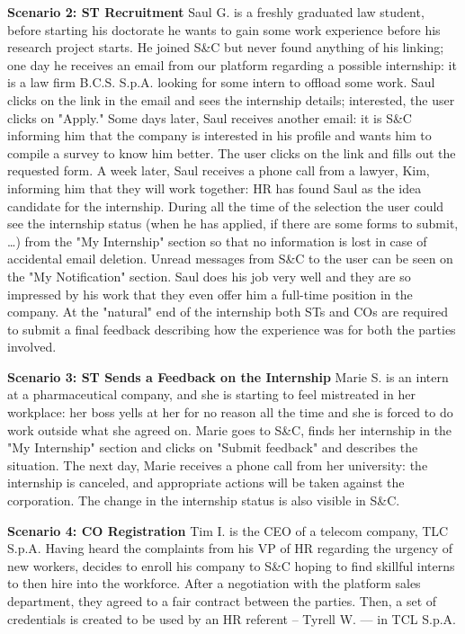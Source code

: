 \par{\textbf{Scenario 2: ST Recruitment}} Saul G. is a freshly graduated law student, before starting his doctorate
he wants to gain some work experience before his research project starts. He joined S\&C but never found anything of his
linking; one day he receives an email from our platform regarding a possible internship: it is a law firm B.C.S. S.p.A.
looking for some intern to offload some work. Saul clicks on the link in the email and sees the internship details;
interested, the user clicks on "Apply." Some days later, Saul receives another email: it is S\&C informing him that the
company is interested in his profile and wants him to compile a survey to know him better. The user clicks on the link
and fills out the requested form. A week later, Saul receives a phone call from a lawyer, Kim, informing him that they
will work together: HR has found Saul as the idea candidate for the internship. During all the time of the selection
the user could see the internship status (when he has applied, if there are some forms to submit, …) from the
"My Internship" section so that no information is lost in case of accidental email deletion. Unread messages from S\&C
to the user can be seen on the "My Notification" section. Saul does his job very well and they are so impressed by his
work that they even offer him a full-time position in the company. At the "natural" end of the internship both STs and
COs are required to submit a final feedback describing how the experience was for both the parties involved.

\par{\textbf{Scenario 3: ST Sends a Feedback on the Internship}} Marie S. is an intern at a pharmaceutical company,
and she is starting to feel mistreated in her workplace: her boss yells at her for no reason all the time and she is
forced to do work outside what she agreed on. Marie goes to S\&C, finds her internship in the "My Internship" section
and clicks on "Submit feedback" and describes the situation. The next day, Marie receives a phone call from her
university: the internship is canceled, and appropriate actions will be taken against the corporation. The change in
the internship status is also visible in S\&C.

\par{\textbf{Scenario 4: CO Registration}} Tim I. is the CEO of a telecom company, TLC S.p.A. Having heard the
complaints from his VP of HR regarding the urgency of new workers, decides to enroll his company to S\&C hoping to find
skillful interns to then hire into the workforce. After a negotiation with the platform sales department, they agreed
to a fair contract between the parties. Then, a set of credentials is created to be used by an HR referent
– Tyrell W. — in TCL S.p.A.

